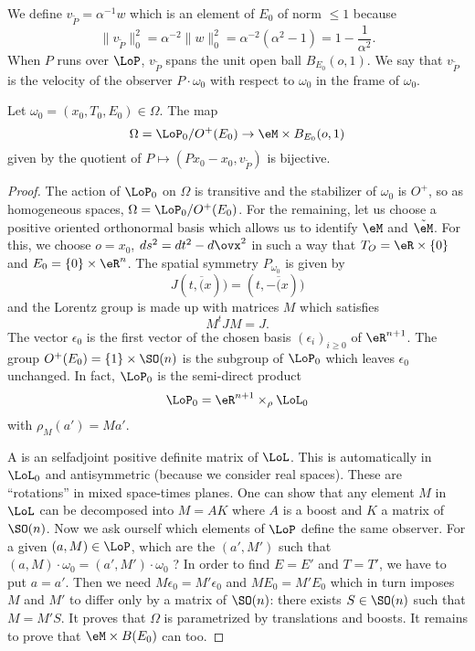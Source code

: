 We define $v_{\tilde P}=\alpha^{-1}w$ which is an element of $E_0$ of norm $\leq 1$ because
\[ 
  \| v_{\tilde P} \|_0^2=\alpha^{-2}\| w \|_0^2=\alpha^{-2}(\alpha^2-1)=1-\frac{1}{ \alpha^2 }.
\]
When $P$ runs over $\LoP$, $v_{\tilde P}$ spans the unit open ball $B_{E_0}(o,1)$. We say that $v_{\tilde P}$ is the velocity of the observer $P\cdot \omega_0$ with respect to $\omega_0$ in the frame of $\omega_0$. 


\begin{proposition}
Let $\omega_0=(x_0,T_0,E_0)\in\Omega$. The map
\[ 
  \Omega=\LoP_0/O^+(E_0)\to \eM\times B_{E_0}(o,1)
\]
given by the quotient of $P\mapsto(Px_0-x_0,v_{\tilde P})$ is bijective.
\end{proposition}

\begin{proof}
The action of $\LoP_0$ on $\Omega$ is transitive and the stabilizer of $\omega_0$ is $O^+$, so as homogeneous spaces, $\Omega=\LoP_0/O^+(E_0)$. For the remaining, let us choose a positive oriented orthonormal basis which allows us to identify $\eM$ and $\tilde\eM$. For this, we choose $o=x_0$, $ds^2=dt^2-d\ovx^2$ in such a way that $T_O=\eR\times\{ 0 \}$ and $E_0=\{ 0 \}\times \eR^n$. The spatial symmetry $P_{\omega_0}$ is given by 
\[ 
    J(t,\overline(x))=(t,-\overline(x))
\]
and the Lorentz group is made up with matrices $M$ which satisfies
\[ 
  M^tJM=J.
\]
The vector $\epsilon_0$ is the first vector of the chosen basis $(\epsilon_i)_{i\geq 0}$ of $\eR^{n+1}$. The group $O^+(E_0)=\{ 1 \}\times \SO(n)$ is the subgroup of $\LoP_0$ which leaves $\epsilon_0$ unchanged. In fact, $\LoP_0$ is the semi-direct product
\begin{equation}
  \LoP_0=\eR^{n+1}\times_{\rho}\LoL_0
\end{equation}
with $\rho_M(a')=Ma'$.

A  is an selfadjoint positive definite matrix of $\LoL$. This is automatically in $\LoL_0$ and antisymmetric (because we consider real spaces). These are ``rotations'' in mixed space-times planes. One can show that any element $M$ in $\LoL$ can be decomposed into $M=AK$ where $A$ is a boost and $K$ a matrix of $\SO(n)$. Now we ask ourself which elements of $\LoP$ define the same observer. For a given $(a,M)\in\LoP$, which are the $(a',M')$ such that $(a,M)\cdot\omega_0=(a',M')\cdot \omega_0$ ? In order to find $E=E'$ and $T=T'$, we have to put $a=a'$. Then we need $M\epsilon_0=M'\epsilon_0$ and $ME_0=M'E_0$ which in turn imposes $M$ and $M'$ to differ only by a matrix of $\SO(n)$: there exists $S\in \SO(n)$ such that $M=M'S$. It proves that $\Omega$ is parametrized by translations and boosts. It remains to prove that $\eM\times B(E_0)$ can too.


\end{proof}
